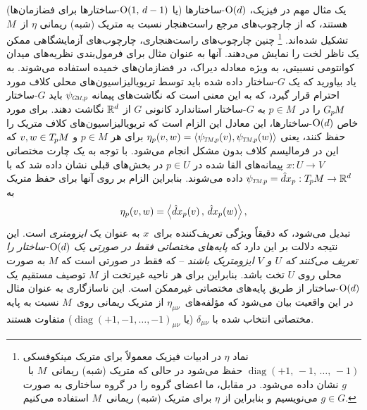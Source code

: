 یک مثال مهم در فیزیک، $\operatorname{O}(d)$-ساختارها (یا $\operatorname{O}(1,\, d-1)$-ساختارها برای فضازمان‌ها) هستند، که از چارچوب‌های مرجع راست‌هنجار نسبت به متریک (شبه) ریمانی $\eta$ از~$M$ تشکیل شده‌اند.%
\footnote{
	نماد $\eta$ در ادبیات فیزیک معمولاً برای متریک مینکوفسکی $\operatorname{diag}(+1,\, -1,\, \dots,\, -1)$ حفظ می‌شود در حالی که متریک (شبه) ریمانی~$M$ با~$g$ نشان داده می‌شود.
	در مقابل، ما اعضای گروه را در گروه ساختاری به صورت $g\in G$ می‌نویسیم و بنابراین از $\eta$ برای متریک (شبه) ریمانی~$M$ استفاده می‌کنیم.
}
چنین چارچوب‌های راست‌هنجاری، چارچوب‌های آزمایشگاهی ممکن یک ناظر لخت را نمایش می‌دهند.
آنها به عنوان مثال برای فرمول‌بندی نظریه‌های میدان کوانتومی نسبیتی، به ویژه معادله دیراک، در فضازمان‌های خمیده استفاده می‌شوند.
به یاد بیاورید که یک $G$-ساختار داده شده باید توسط تریویالیزاسیون‌های محلی کلاف مورد احترام قرار گیرد، که به این معنی است که نگاشت‌های پیمانه $\psiGMp$ باید $G$-ساختار $G_{\mkern-1.3mu p}\mkern-1.2muM$ را در~$p\in M$ به $G$-ساختار استاندارد کانونی $G$ از $\mathbb{R}^d$ نگاشت دهند.
برای مورد خاص $\operatorname{O}(d)$-ساختارها، این معادل این الزام است که تریویالیزاسیون‌های کلاف متریک را حفظ کنند، یعنی $\eta_p(v,w) = \langle \psiTMp(v), \psiTMp(w) \rangle$ برای هر $p\in M$ و $v,w \in T_{\mkern-1.5mu p}\mkern-.5muM$ که این در فرمالیسم کلاف بدون مشکل انجام می‌شود.
با توجه به یک چارت مختصاتی $x: U \to V$ پیمانه‌های القا شده در $p\in U$ در بخش‌های قبلی نشان داده شد که با $\psiTMp = \hat{d}x_p: \TpM \to \R^d$ داده می‌شوند.
بنابراین الزام بر روی آنها برای حفظ متریک به
\begin{align}
	\eta_p(v,w) = \pig\langle \hat{d}x_p(v) \,,\, \hat{d}x_p(w) \pig\rangle \,,
\end{align}
تبدیل می‌شود، که دقیقاً ویژگی تعریف‌کننده برای~$x$ به عنوان یک \emph{ایزومتری} است.
این نتیجه دلالت بر این دارد که \emph{پایه‌های مختصاتی فقط در صورتی یک $\operatorname{O}(d)$-ساختار را تعریف می‌کنند که $U$ و $V$ ایزومتریک باشند} -- که فقط در صورتی است که $M$ به صورت محلی روی $U$ تخت باشد.
بنابراین برای هر ناحیه غیرتخت از $M$ توصیف مستقیم یک $\operatorname{O}(d)$-ساختار از طریق پایه‌های مختصاتی غیرممکن است.
این ناسازگاری به عنوان مثال در این واقعیت بیان می‌شود که مؤلفه‌های~$\eta_{\mu\nu}$ از متریک ریمانی روی~$M$ نسبت به پایه مختصاتی انتخاب شده با $\delta_{\mu\nu}$ (یا $\operatorname{diag}(+1,-1,\dots,-1)_{\mu\nu}$) متفاوت هستند.


